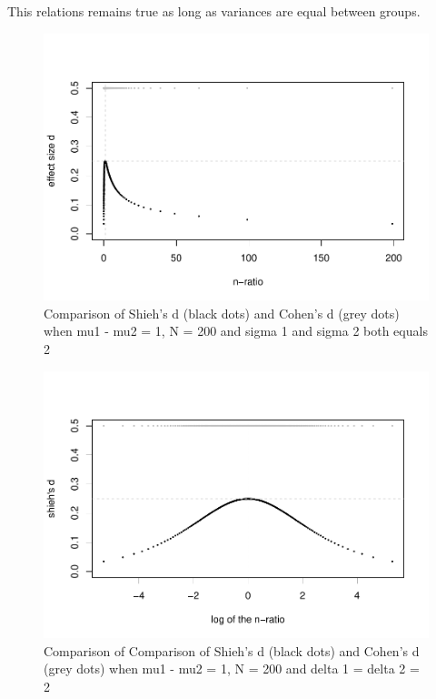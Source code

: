 \documentclass[man]{apa6}
\begin{document}
This relations remains true as long as variances are equal between groups.

\begin{figure}
\centering
\includegraphics{Appendix1_files/figure-latex/SHIEH1-1.pdf}
\caption{\label{fig:SHIEH1}Comparison of Shieh's d (black dots) and Cohen's d (grey dots) when mu1 - mu2 = 1, N = 200 and sigma 1 and sigma 2 both equals 2}
\end{figure}

\begin{figure}
\centering
\includegraphics{Appendix1_files/figure-latex/SHIEH2-1.pdf}
\caption{\label{fig:SHIEH2}Comparison of Comparison of Shieh's d (black dots) and Cohen's d (grey dots) when mu1 - mu2 = 1, N = 200 and delta 1 = delta 2 = 2}
\end{figure}
\end{document}
